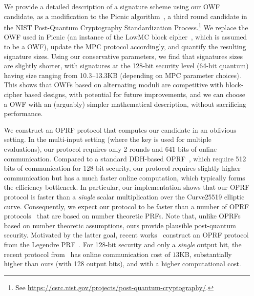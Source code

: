 We provide a detailed description of a signature scheme using our OWF candidate,
as a modification to the Picnic
algorithm~\cite{chase2017-picnic,CCS:KatKolWan18,kales2020-picnic,picnic-spec}, a
third round candidate in the NIST Post-Quantum Cryptography Standardization
Process.\footnote{See
\url{https://csrc.nist.gov/projects/post-quantum-cryptography/}.} We replace
the OWF used in Picnic (an instance of the LowMC block cipher~\cite{albrecht2015-lowmc}, which is assumed to be a OWF),
update the MPC protocol accordingly, and quantify the resulting signature
sizes.  Using our conservative \ttOWF parameters, we find that signatures sizes are slightly shorter, with signatures at
the 128-bit security level (64-bit quantum) having size ranging from 10.3--13.3KB (depending
on MPC parameter choices).  This
shows that OWFs based on alternating moduli are competitive with block-cipher
based designs, with potential for future improvements, and we can choose a OWF with an (arguably) simpler mathematical
description, without sacrificing performance.

We construct an OPRF protocol that computes our \ttwPRF candidate in an oblivious setting. In the multi-input setting (where the key is used for multiple evaluations), our protocol requires only 2 rounds and 641 bits of online communication.
Compared to a standard DDH-based OPRF~\cite{jarecki2014-ddhoprf,jarecki2016-ddhoprf}, which require 512 bits of communication for $128$-bit security, our protocol requires slightly higher communication but has a much faster online computation, which typically forms the efficiency bottleneck. In particular, our implementation shows that our OPRF protocol is faster than a \textit{single} scalar multiplication over the Curve25519 elliptic curve. Consequently, we expect our protocol to be faster than a number of OPRF protocols~\cite{freedman2005-oprf,jarecki2009-oprf} that are based on number theoretic PRFs. Note that, unlike OPRFs based on number theoretic assumptions, ours provide plausible post-quantum security. Motivated by the latter goal, recent works~\cite{grassi2016-mpcfriendly,seres2021-legendre} construct an OPRF protocol from the Legendre PRF~\cite{damgard1988-legendre}. For 128-bit security and only a {\em single} output bit, the recent protocol from~\cite{seres2021-legendre} has online communication cost of $13$KB, substantially higher than ours (with 128 output bits), and with a higher computational cost. 

